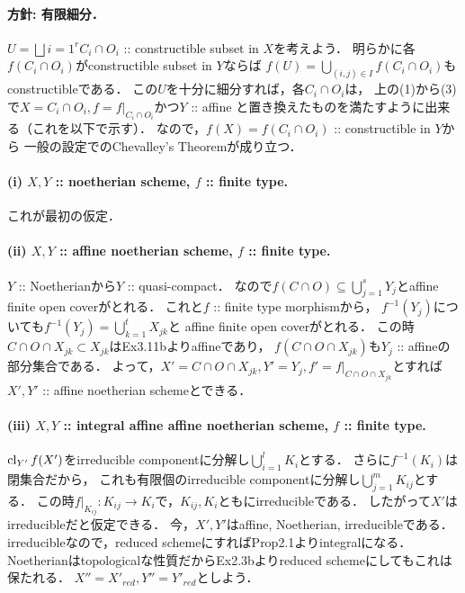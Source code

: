 \documentclass[a4paper]{jsarticle}
\begin{document}
    \paragraph{方針: 有限細分．}
    $U=\bigsqcup{i=1}^r C_i \cap O_i$ :: constructible subset in $X$を考えよう．
    明らかに各$f(C_i \cap O_i)$がconstructible subset in $Y$ならば
    $f(U)=\bigcup_{(i,j) \in I} f(C_i \cap O_i)$もconstructibleである．
    この$U$を十分に細分すれば，各$C_i \cap O_i$は，
    上の(1)から(3)で$X=C_i \cap O_i, f=f|_{C_i \cap O_i}$かつ$Y$ :: affine
    と置き換えたものを満たすように出来る（これを以下で示す）．
    なので，$f(X)=f(C_i \cap O_i)$ :: constructible in $Y$から
    一般の設定でのChevalley's Theoremが成り立つ．

    \paragraph{(i) $X,Y$ :: noetherian scheme, $f$ :: finite type.}
    これが最初の仮定．

    \paragraph{(ii) $X,Y$ :: affine noetherian scheme, $f$ :: finite type.}
    $Y$ :: Noetherianから$Y$ :: quasi-compact．
    なので$f(C \cap O) \subseteq \bigcup_{j=1}^s Y_j$とaffine finite open coverがとれる．
    これと$f$ :: finite type morphismから，
    $f^{-1}(Y_j)$についても$f^{-1}(Y_j)=\bigcup_{k=1}^t X_{jk}$と
    affine finite open coverがとれる．
    この時$C \cap O \cap X_{jk} \subset X_{jk}$はEx3.11bよりaffineであり，
    $f(C \cap O \cap X_{jk})$も$Y_j$ :: affineの部分集合である．
    よって，$X'=C \cap O \cap X_{jk}, Y'=Y_j, f'=f|_{C \cap O \cap X_{jk}}$とすれば
    $X',Y'$ :: affine noetherian schemeとできる．

    \paragraph{(iii) $X,Y$ :: integral affine affine noetherian scheme, $f$ :: finite type.}
    $\operatorname{cl}_{Y'}f(X')$をirreducible componentに分解し$\bigcup_{i=1}^l K_i$とする．
    さらに$f^{-1}(K_i)$は閉集合だから，
    これも有限個のirreducible componentに分解し$\bigcup_{j=1}^m K_{ij}$とする．
    この時$f|_{K_{ij}}: K_{ij} \to K_i$で，$K_{ij}, K_i$ともにirreducibleである．
    したがって$X'$はirreducibleだと仮定できる．
    今，$X', Y'$はaffine, Noetherian, irreducibleである．
    irreducibleなので，reduced schemeにすればProp2.1よりintegralになる．
    Noetherianはtopologicalな性質だからEx2.3bよりreduced schemeにしてもこれは保たれる．
    $X''=X'_{red}, Y''=Y'_{red}$としよう．
\end{document}
